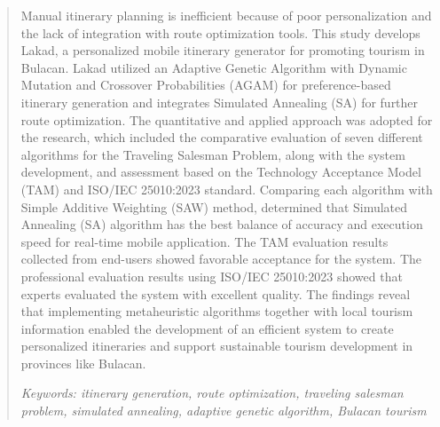 \begin{abstract}
Manual itinerary planning is inefficient because of poor personalization and the lack of integration with route optimization tools. This study develops Lakad, a personalized mobile itinerary generator for promoting tourism in Bulacan. Lakad utilized an Adaptive Genetic Algorithm with Dynamic Mutation and Crossover Probabilities (AGAM) for preference-based itinerary generation and integrates Simulated Annealing (SA) for further route optimization. The quantitative and applied approach was adopted for the research, which included the comparative evaluation of seven different algorithms for the Traveling Salesman Problem, along with the system development, and assessment based on the Technology Acceptance Model (TAM) and ISO/IEC 25010:2023 standard. Comparing each algorithm with Simple Additive Weighting (SAW) method, determined that Simulated Annealing (SA) algorithm has the best balance of accuracy and execution speed for real-time mobile application. The  TAM evaluation results collected from end-users showed favorable acceptance for the system. The professional evaluation results using ISO/IEC 25010:2023 showed that experts evaluated the system with excellent quality. The findings reveal that implementing metaheuristic algorithms together with local tourism information enabled the development of an efficient system to create personalized itineraries and support sustainable tourism development in provinces like Bulacan.

\vspace{0.5cm}

\noindent\textit{Keywords:  itinerary generation, route optimization, traveling salesman problem, simulated annealing, adaptive genetic algorithm, Bulacan tourism}
\end{abstract}
